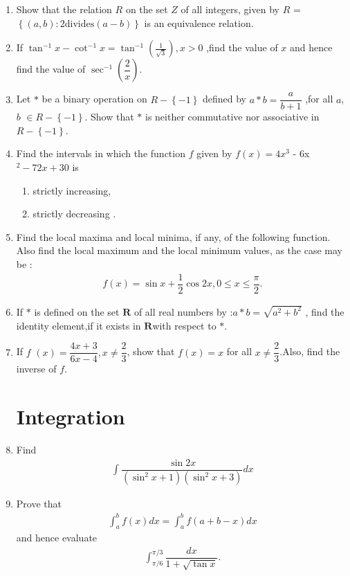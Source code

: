\documentclass[12pt,-letter paper]{article}
\providecommand{\cbrak}[1]{\ensuremath{\left\{#1\right\}}}
\providecommand{\brak}[1]{\ensuremath{\left(#1\right)}}
\begin{document}
\begin{enumerate}
\item Show that the relation $R$ on the set $Z$ of all integers, given by $R$ =$\cbrak {\brak{a, b}:2 \text{divides} \brak{a - b}}$ is an equivalence relation.

\item If $\tan^{-1}x-\cot^{-1}x =\tan^{-1}\brak{\frac{1}{ \sqrt3}}, x>0$ ,find the value of $x$ and hence find the value of $\sec^{-1}\left(\dfrac{2}{x}\right)$.

\item Let $*$ be a binary operation on $R-\cbrak{-1}$ defined by $a * b = \dfrac{a}{b+1}$ ,for all $a$, $b$ $\in R -\cbrak{-1}$.
Show that $*$ is neither commutative nor associative in $R-\cbrak{-1}$.

\item Find the intervals in which the function $f$ given by $f(x) = 4x^{3}$ - 6x$^{2}-72x+ 30$ is
\begin{enumerate}
    \item  strictly increasing,
     \item strictly decreasing .
\end{enumerate}

\item Find the local maxima and local minima, if any, of the following function. Also find the local maximum and the local minimum values, as the case may be :
\begin{align*}
    f\brak{x}=\sin x + \dfrac{1}{2} \cos 2x,0\leq x \leq \dfrac{\pi}{2}.
\end{align*}

\item If $*$ is defined on the set $\textbf{R}$ of all real numbers by :$ a * b =\sqrt{a^{2}+b^{2}}$ ,
find the identity element,if it exists in $\textbf{R}$with respect to $*$.

\item If $f$ $\brak{x}=\dfrac{4x+3}{6x-4},x \neq  \dfrac{2}{3} $, show that $f \brak{x}= x$ for all $x\neq \dfrac{2}{3}$.Also, find the inverse of $f$.

\section{Integration}

\item Find
\begin{align*}
\int\dfrac{\sin{2}x}{(\sin^{2}x+1)(\sin^{2}x+3)} dx
\end{align*}

\item Prove that 
\begin{align*}
\int_{a}^{b} f(x)dx=\int_{a}^{b}{f(a+b-x)dx}
\end{align*}
and hence evaluate
\begin{align*}
    \int_{\pi/6}^{\pi/3}\dfrac{dx}{1+\sqrt{\tan{x}}}.
\end{align*}


\end{enumerate}
\end{document}
